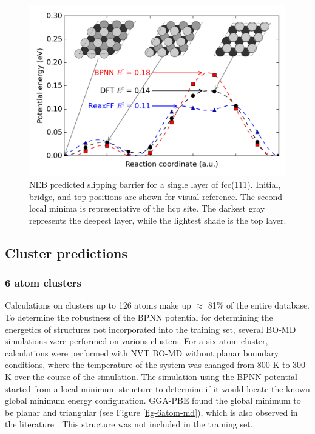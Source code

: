 \documentclass[12pt]{cmuthesis}
\begin{document}
\begin{figure}[h]
\centering
\includegraphics[width=5in]{./images/fig-111-slipping.png}
\caption{\label{fig-111-slipping}
NEB predicted slipping barrier for a single layer of fcc(111). Initial, bridge, and top positions are shown for visual reference. The second local minima is representative of the hcp site. The darkest gray represents the deepest layer, while the lightest shade is the top layer.}
\end{figure}
\subsection{Cluster predictions}
\label{sec:org443680c}
\subsubsection{6 atom clusters}
\label{sec:org9455628}
Calculations on clusters up to 126 atoms make up \(\approx\) 81\% of the entire database. To determine the robustness of the BPNN potential for determining the energetics of structures not incorporated into the training set, several BO-MD simulations were performed on various clusters. For a six atom cluster, calculations were performed with NVT BO-MD without planar boundary conditions, where the temperature of the system was changed from 800 K to 300 K over the course of the simulation. The simulation using the BPNN potential started from a local minimum structure to determine if it would locate the known global minimum energy configuration. GGA-PBE found the global minimum to be planar and triangular (see Figure \ref{fig-6atom-md}), which is also observed in the literature \cite{phaisangittisakul-2012-stabl}. This structure was not included in the training set.
\end{document}
